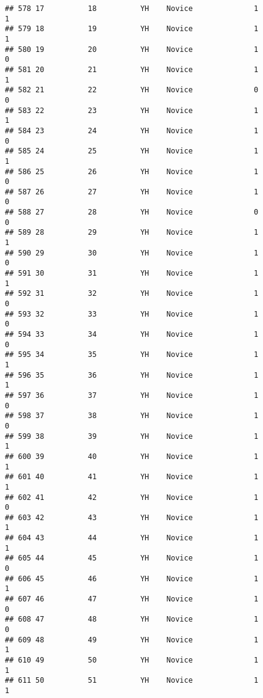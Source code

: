 \documentclass[
]{article}
\begin{document}
\begin{verbatim}
## 578 17          18          YH    Novice              1                 1
## 579 18          19          YH    Novice              1                 1
## 580 19          20          YH    Novice              1                 0
## 581 20          21          YH    Novice              1                 1
## 582 21          22          YH    Novice              0                 0
## 583 22          23          YH    Novice              1                 1
## 584 23          24          YH    Novice              1                 0
## 585 24          25          YH    Novice              1                 1
## 586 25          26          YH    Novice              1                 0
## 587 26          27          YH    Novice              1                 0
## 588 27          28          YH    Novice              0                 0
## 589 28          29          YH    Novice              1                 1
## 590 29          30          YH    Novice              1                 0
## 591 30          31          YH    Novice              1                 1
## 592 31          32          YH    Novice              1                 0
## 593 32          33          YH    Novice              1                 0
## 594 33          34          YH    Novice              1                 0
## 595 34          35          YH    Novice              1                 1
## 596 35          36          YH    Novice              1                 1
## 597 36          37          YH    Novice              1                 0
## 598 37          38          YH    Novice              1                 0
## 599 38          39          YH    Novice              1                 1
## 600 39          40          YH    Novice              1                 1
## 601 40          41          YH    Novice              1                 1
## 602 41          42          YH    Novice              1                 0
## 603 42          43          YH    Novice              1                 1
## 604 43          44          YH    Novice              1                 1
## 605 44          45          YH    Novice              1                 0
## 606 45          46          YH    Novice              1                 1
## 607 46          47          YH    Novice              1                 0
## 608 47          48          YH    Novice              1                 0
## 609 48          49          YH    Novice              1                 1
## 610 49          50          YH    Novice              1                 1
## 611 50          51          YH    Novice              1                 1

\end{verbatim}
\end{document}
